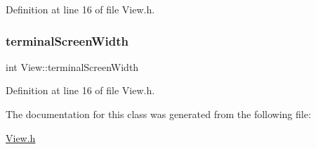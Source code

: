 Definition at line 16 of file View.\+h.

\mbox{\label{class_view_a1f50d3146f942418e80b1085935e1a05}} 
\subsubsection{\texorpdfstring{terminal\+Screen\+Width}{terminalScreenWidth}}
{\footnotesize\ttfamily int View\+::terminal\+Screen\+Width\hspace{0.3cm}{\ttfamily [protected]}}



Definition at line 16 of file View.\+h.



The documentation for this class was generated from the following file\+:\begin{DoxyCompactItemize}
\item 
\mbox{\hyperlink{_view_8h}{View.\+h}}\end{DoxyCompactItemize}
